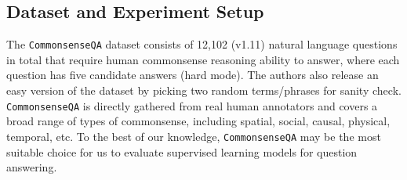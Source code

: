 \documentclass[11pt,a4paper]{article}
\begin{document}
\begin{table*}[t]
	\centering
	\caption{Comparisons with large pre-trained language model fine-tuning with different amount of training data. \vspace{0pt}}
	\label{tab:IHfrac}
\end{table*}
\subsection{Dataset and Experiment Setup}
The \texttt{CommonsenseQA} dataset consists of 12,102 (v1.11) natural language questions in total that require human commonsense reasoning ability to answer, where each question has five candidate answers (hard mode).
The authors also release an easy version of the dataset by picking two random terms/phrases for sanity check.
\texttt{CommonsenseQA} is directly gathered from real human annotators and covers a broad range of types of commonsense, including spatial, social, causal, physical, temporal, etc.
To the best of our knowledge, \texttt{CommonsenseQA} may be the most suitable choice
for us to evaluate supervised learning models for question answering.
\end{document}

